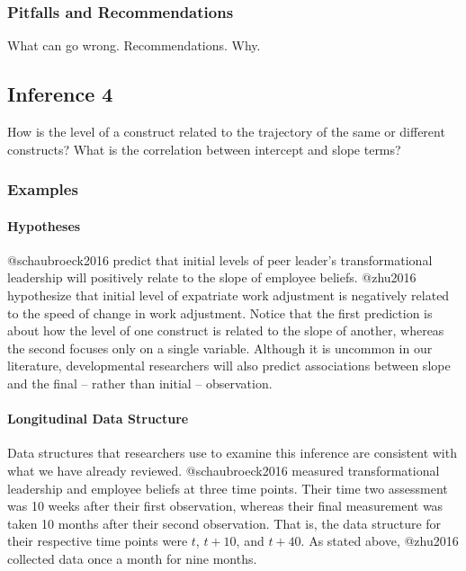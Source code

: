 \documentclass[]{article}
\let\oldparagraph\paragraph
\renewcommand{\paragraph}[1]{\oldparagraph{#1}\mbox{}}
\begin{document}
\hypertarget{pitfalls-and-recommendations-3}{%
\subsubsection{Pitfalls and
Recommendations}\label{pitfalls-and-recommendations-3}}

What can go wrong. Recommendations. Why.

\hypertarget{inference-4}{%
\subsection{Inference 4}\label{inference-4}}

How is the level of a construct related to the trajectory of the same or
different constructs? What is the correlation between intercept and
slope terms?

\hypertarget{examples-4}{%
\subsubsection{Examples}\label{examples-4}}

\hypertarget{hypotheses-4}{%
\paragraph{Hypotheses}\label{hypotheses-4}}

@schaubroeck2016 predict that initial levels of peer leader's
transformational leadership will positively relate to the slope of
employee beliefs. @zhu2016 hypothesize that initial level of expatriate
work adjustment is negatively related to the speed of change in work
adjustment. Notice that the first prediction is about how the level of
one construct is related to the slope of another, whereas the second
focuses only on a single variable. Although it is uncommon in our
literature, developmental researchers will also predict associations
between slope and the final -- rather than initial -- observation.

\hypertarget{longitudinal-data-structure-4}{%
\paragraph{Longitudinal Data
Structure}\label{longitudinal-data-structure-4}}

Data structures that researchers use to examine this inference are
consistent with what we have already reviewed. @schaubroeck2016 measured
transformational leadership and employee beliefs at three time points.
Their time two assessment was 10 weeks after their first observation,
whereas their final measurement was taken 10 months after their second
observation. That is, the data structure for their respective time
points were \(t\), \(t + 10\), and \(t + 40\). As stated above, @zhu2016
collected data once a month for nine months.
\end{document}

